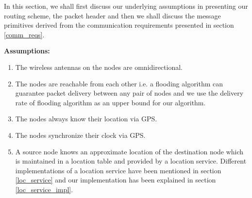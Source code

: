 In this section, we shall first discuss our underlying assumptions in presenting our routing scheme, the packet header and then we shall discuss the message primitives derived from the communication requirements presented in section \ref{comm_reqs}.  

\textbf{Assumptions:}
\begin{enumerate}
\item The wireless antennas on the nodes are omnidirectional.
\item The nodes are reachable from each other i.e. a flooding algorithm can guarantee packet delivery between any pair of nodes and we use the delivery rate of flooding algorithm as an upper bound for our algorithm.
\item The nodes always know their location via GPS. 
\item The nodes synchronize their clock via GPS.
\item A source node knows an approximate location of the destination node which is maintained in a location table and provided by a location service. Different implementations of a location service have been mentioned in section \ref{loc_service} and our implementation has been explained in section \ref{loc_service_impl}. 
\end{enumerate}

